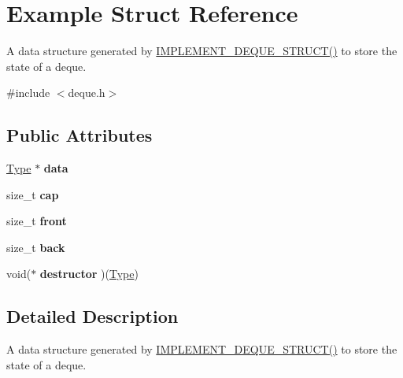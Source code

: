\hypertarget{structExample}{}\section{Example Struct Reference}
\label{structExample}


A data structure generated by \hyperlink{deque_8h_a091cfc1289538b13036bcd36d12a3c01}{I\+M\+P\+L\+E\+M\+E\+N\+T\+\_\+\+D\+E\+Q\+U\+E\+\_\+\+S\+T\+R\+U\+C\+T()} to store the state of a deque.  




{\ttfamily \#include $<$deque.\+h$>$}

\subsection*{Public Attributes}
\begin{DoxyCompactItemize}
\item 
\mbox{\label{structExample_aff9c97770bf4afc778ac2fc0c693d3b0}} 
\hyperlink{group__DEQUE_gac9c83c2070eb6b5891cf742b90f54c68}{Type} $\ast$ {\bfseries data}
\item 
\mbox{\label{structExample_a42fd483a97081133af34019cfb99c875}} 
size\+\_\+t {\bfseries cap}
\item 
\mbox{\label{structExample_ad28f26e5c53b98255d98b65e82fae766}} 
size\+\_\+t {\bfseries front}
\item 
\mbox{\label{structExample_ab52696b8c662a542dccff1fabda7de00}} 
size\+\_\+t {\bfseries back}
\item 
\mbox{\label{structExample_ae42fbec90128c56bc0c81d06cc17acd3}} 
void($\ast$ {\bfseries destructor} )(\hyperlink{group__DEQUE_gac9c83c2070eb6b5891cf742b90f54c68}{Type})
\end{DoxyCompactItemize}


\subsection{Detailed Description}
A data structure generated by \hyperlink{deque_8h_a091cfc1289538b13036bcd36d12a3c01}{I\+M\+P\+L\+E\+M\+E\+N\+T\+\_\+\+D\+E\+Q\+U\+E\+\_\+\+S\+T\+R\+U\+C\+T()} to store the state of a deque. 

